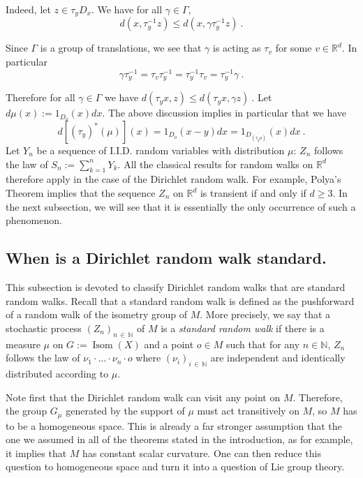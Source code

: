 \documentclass[AHL,Unicode,longabstracts,published]{cedram}
\DeclareMathOperator{\Isom}{Isom}
\newcommand{\RR}{\mathbb{R}}
\newcommand{\NN}{\mathbb{N}}
\newcommand{\G}{\Gamma}
\newcommand{\g}{\gamma}
\begin{document}
Indeed, let $z\in \tau_y D_x$. We have for all $\g \in \G$,
\[
d\left(x, \tau^{-1}_y z\right) \leq d\left(x, \g \tau^{-1}_y z\right) \ .
\]

Since $\G$ is a group of translations, we see that $\g$ is acting as $\tau_v$ for some $v\in \RR^d$. In particular
\[
\g \tau^{-1}_y = \tau_v \tau^{-1}_y = \tau^{-1}_y \tau_v = \tau^{-1}_y \g \ .
\]

Therefore for all $\g\in \G$ we have $d(\tau_y x, z) \leq d(\tau_y x, \g z) \ .$ Let $d\mu (x) := 1_{D_o} (x) dx$. The above discussion implies in particular that we have
\begin{equation}\label{eq.toruscase}
d \left[\left({\tau_y}\right)^*(\mu)\right] (x) = 1_{D_o}(x-y)dx = 1_{D_{\left(\tau_y o\right)}}(x)dx \ .
\end{equation}
Let $Y_n$ be a sequence of I.I.D. random variables with distribution $\mu$: $Z_n$ follows the law of $S_n:= \sum_{k=1}^n Y_k$. All the classical results for random walks on $\RR^d$ therefore apply in the case of the Dirichlet random walk. For example, Polya's Theorem implies that the sequence $Z_n$ on $\RR^d$ is transient if and only if $d \geq 3$. In the next subsection, we will see that it is essentially the only occurrence of such a phenomenon.

\subsection{When is a Dirichlet random walk standard.}

This subsection is devoted to classify Dirichlet random walks that are standard random walks. Recall that a standard random walk is defined as the pushforward of a random walk of the isometry group of $M$. More precisely, we say that a stochastic process $(Z_n)_{n\,\in\,\NN}$ of $M$ is a \emph{standard random walk} if there is a measure $\mu$ on $G := \Isom(X)$ and a point $o \in M$ such that for any $n \in \NN$, $Z_n$ follows the law of $ \nu_1 \cdot\dots \cdot \nu_n \cdot o $ where $(\nu_i)_{i \,\in\,\NN}$ are independent and identically distributed according to $\mu$. 

Note first that the Dirichlet random walk can visit any point on $M$. Therefore, the group $G_{\mu}$ generated by the support of $\mu$ must act transitively on $M$, so $M$ has to be a homogeneous space. This is already a far stronger assumption that the one we assumed in all of the theorems stated in the introduction, as for example, it implies that $M$ has constant scalar curvature. One can then reduce this question to homogeneous space and turn it into a question of Lie group theory. 
\end{document}
